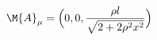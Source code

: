 \begin{equation}
\M{A}_{\mu} = \Bigl(0,0,\frac{\rho l}{\sqrt{2+2\rho^2x^2}}\Bigr)
\label{2.32}
\end{equation}

